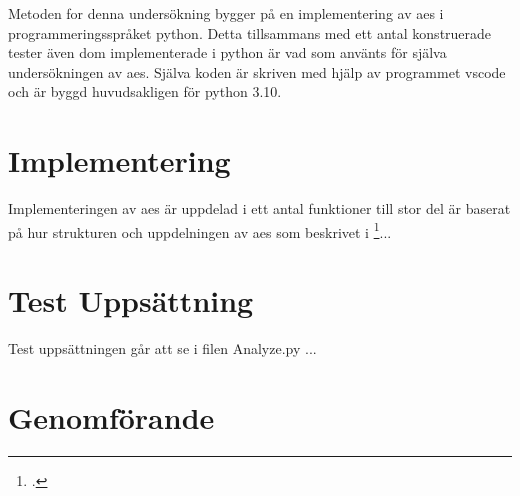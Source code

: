 Metoden for denna undersökning bygger på en implementering av \acrshort{aes} i programmeringsspråket
\gls{python}. Detta tillsammans med ett antal konstruerade tester även dom implementerade i
\gls{python} är vad som använts för själva undersökningen av \acrshort{aes}. Själva koden
är skriven med hjälp av programmet \gls{vscode} och är byggd huvudsakligen för \gls{python} 3.10.

\section{Implementering}
Implementeringen av \acrshort{aes} är uppdelad i ett antal funktioner till stor del är baserat på
hur strukturen och uppdelningen av \acrshort{aes} som beskrivet i \footcite{daemen1999aes}...

\section{Test Uppsättning}
Test uppsättningen går att se i filen Analyze.py ...

\section{Genomförande}